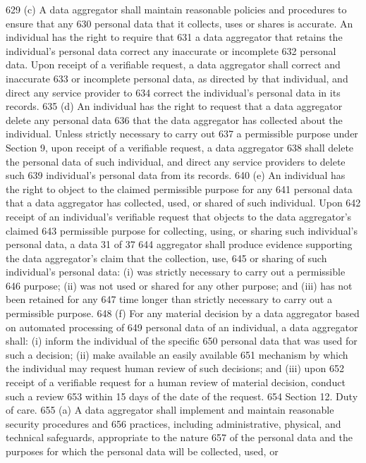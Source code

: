 629 (c) A data aggregator shall maintain reasonable policies and procedures to ensure that any
630 personal data that it collects, uses or shares is accurate. An individual has the right to require that
631 a data aggregator that retains the individual’s personal data correct any inaccurate or incomplete
632 personal data. Upon receipt of a verifiable request, a data aggregator shall correct and inaccurate
633 or incomplete personal data, as directed by that individual, and direct any service provider to
634 correct the individual’s personal data in its records.
635 (d) An individual has the right to request that a data aggregator delete any personal data
636 that the data aggregator has collected about the individual. Unless strictly necessary to carry out
637 a permissible purpose under Section 9, upon receipt of a verifiable request, a data aggregator
638 shall delete the personal data of such individual, and direct any service providers to delete such
639 individual’s personal data from its records.
640 (e) An individual has the right to object to the claimed permissible purpose for any
641 personal data that a data aggregator has collected, used, or shared of such individual. Upon
642 receipt of an individual’s verifiable request that objects to the data aggregator’s claimed
643 permissible purpose for collecting, using, or sharing such individual’s personal data, a data
31 of 37
644 aggregator shall produce evidence supporting the data aggregator’s claim that the collection, use,
645 or sharing of such individual’s personal data: (i) was strictly necessary to carry out a permissible
646 purpose; (ii) was not used or shared for any other purpose; and (iii) has not been retained for any
647 time longer than strictly necessary to carry out a permissible purpose.
648 (f) For any material decision by a data aggregator based on automated processing of
649 personal data of an individual, a data aggregator shall: (i) inform the individual of the specific
650 personal data that was used for such a decision; (ii) make available an easily available
651 mechanism by which the individual may request human review of such decisions; and (iii) upon
652 receipt of a verifiable request for a human review of material decision, conduct such a review
653 within 15 days of the date of the request.
654 Section 12. Duty of care.
655 (a) A data aggregator shall implement and maintain reasonable security procedures and
656 practices, including administrative, physical, and technical safeguards, appropriate to the nature
657 of the personal data and the purposes for which the personal data will be collected, used, or
